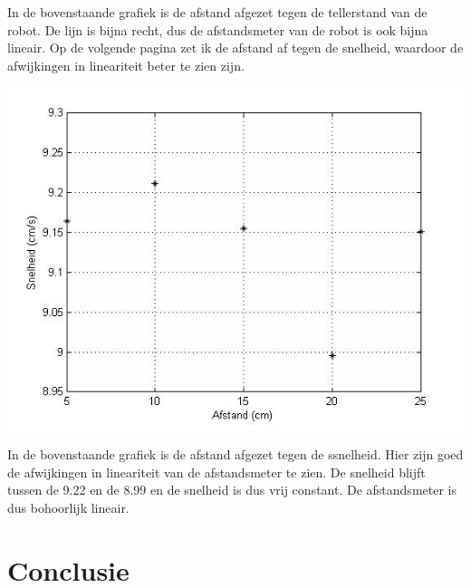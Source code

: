 \documentclass[12pt]{book}
\begin{document}
In de bovenstaande grafiek is de afstand afgezet tegen de tellerstand van de robot. De lijn is bijna recht, dus de afstandsmeter van de robot is ook bijna lineair. Op de volgende pagina zet ik de afstand af tegen de snelheid, waardoor de afwijkingen in lineariteit beter te zien zijn. 
\begin{center}
\includegraphics[width=150mm] {afstand-snelheid.jpg}
\end{center}
In de bovenstaande grafiek is de afstand afgezet tegen de ssnelheid. Hier zijn goed de afwijkingen in lineariteit van de afstandsmeter te zien. De snelheid blijft tussen de 9.22 en de 8.99 en de snelheid is dus vrij constant. De afstandsmeter is dus bohoorlijk lineair. 
\section*{Conclusie}
\end{document}

